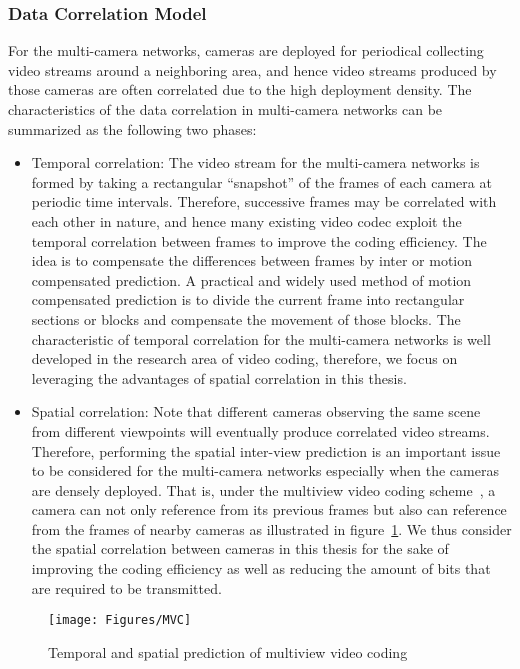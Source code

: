\subsubsection{Data Correlation Model}
For the multi-camera networks, cameras are deployed for periodical collecting video streams around a neighboring area, and hence video streams produced by those cameras are often correlated due to the high deployment density.
The characteristics of the data correlation in multi-camera networks can be summarized as the following two phases:
\begin{itemize}
\item Temporal correlation: The video stream for the multi-camera networks is formed by taking a rectangular ``snapshot'' of the frames of each camera at periodic time intervals.
Therefore, successive frames may be correlated with each other in nature, and hence many existing video codec exploit the temporal correlation between frames to improve the coding efficiency.
The idea is to compensate the differences between frames by inter or motion compensated prediction.
A practical and widely used method of motion compensated prediction is to divide the current frame into rectangular sections or blocks and compensate the movement of those blocks.
The characteristic of temporal correlation for the multi-camera networks is well developed in the research area of video coding, therefore, we focus on leveraging the advantages of spatial correlation in this thesis.
\item Spatial correlation: Note that different cameras observing the same scene from different viewpoints will eventually produce correlated video streams.
Therefore, performing the spatial inter-view prediction is an important issue to be considered for the multi-camera networks especially when the cameras are densely deployed.
That is, under the multiview video coding scheme~\cite{MVCoverview}, a camera can not only reference from its previous frames but also can reference from the frames of nearby cameras as illustrated in figure~\ref{fig::MVC}.
We thus consider the spatial correlation between cameras in this thesis for the sake of improving the coding efficiency as well as reducing the amount of bits that are required to be transmitted.  
\end{itemize}
%
\begin{figure}
\centering
\texttt{[image: Figures/MVC]}
\caption{Temporal and spatial prediction of multiview video coding\label{fig::MVC}}
\end{figure}
%


